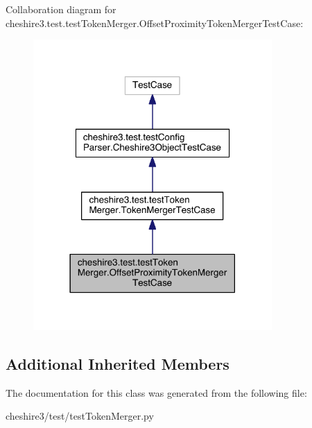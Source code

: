 Collaboration diagram for cheshire3.\-test.\-test\-Token\-Merger.\-Offset\-Proximity\-Token\-Merger\-Test\-Case\-:
\nopagebreak
\begin{figure}[H]
\begin{center}
\leavevmode
\includegraphics[width=258pt]{classcheshire3_1_1test_1_1test_token_merger_1_1_offset_proximity_token_merger_test_case__coll__graph}
\end{center}
\end{figure}
\subsection*{Additional Inherited Members}


The documentation for this class was generated from the following file\-:\begin{DoxyCompactItemize}
\item 
cheshire3/test/test\-Token\-Merger.\-py\end{DoxyCompactItemize}
